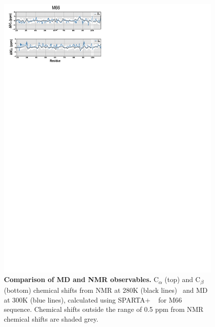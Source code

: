 \documentclass[10pt,letterpaper]{article}
\begin{document}
 \begin{figure}[!ht]
\includegraphics[scale=0.5,width=\textwidth,trim={0 0cm 0 0cm},clip]{../figures/S2.pdf}
\caption{{\bf Comparison of MD and NMR observables.} C\textsubscript{$\alpha$} (top) and C\textsubscript{$\beta$} (bottom) chemical shifts from NMR at 280K (black lines)~\cite{Anastasia2013} and MD at 300K (blue lines), calculated using SPARTA+ ~\cite{Shen2010} for M66 sequence. Chemical shifts outside the range of 0.5 ppm from NMR chemical shifts are shaded grey.}
\label{S2} 
\end{figure}
\end{document}
